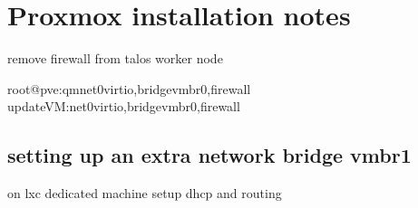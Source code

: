 \documentclass[letterpaper,10pt,english]{sphinxmanual}
\begin{document}
\sphinxstepscope


\chapter{Proxmox  installation notes}
\label{\detokenize{cluster:proxmox-installation-notes}}\label{\detokenize{cluster::doc}}
\sphinxAtStartPar
remove firewall from talos worker node

\begin{sphinxVerbatim}[commandchars=\\\{\}]
root@pve:\PYGZti{}\PYGZsh{}qm\PYGZhy{}net0virtio,bridgevmbr0,firewall
updateVM:\PYGZhy{}net0virtio,bridgevmbr0,firewall
\end{sphinxVerbatim}


\section{setting up an extra network bridge vmbr1}
\label{\detokenize{cluster:setting-up-an-extra-network-bridge-vmbr1}}
\sphinxAtStartPar
on lxc dedicated machine setup dhcp and routing
\end{document}

